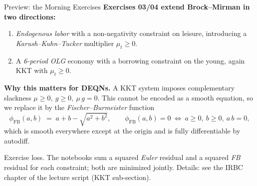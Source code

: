 \documentclass[aspectratio=169,11pt]{beamer}
\newcommand{\emphc}[1]{\textcolor{harvardcrimson}{#1}}
\begin{document}
\begin{frame}{Preview: the Morning Exercises}
\footnotesize
\textbf{Exercises 03/04 extend Brock--Mirman in two directions:}
\begin{enumerate}\itemsep2pt
    \item \emph{Endogenous labor} with a non-negativity constraint on leisure, introducing a \emph{Karush--Kuhn--Tucker} multiplier $\mu_t \ge 0$.
    \item A \emph{6-period OLG} economy with a borrowing constraint on the young, again KKT with $\mu_t \ge 0$.
\end{enumerate}

\vspace{0.4em}
\textbf{Why this matters for DEQNs.}  A KKT system imposes complementary slackness $\mu \ge 0,\ g \ge 0,\ \mu\,g = 0$.  This cannot be encoded as a smooth equation, so we replace it by the \emph{Fischer--Burmeister} function
\[
\phi_{\mathrm{FB}}(a,b) \;=\; a + b - \sqrt{a^2 + b^2}, \qquad \phi_{\mathrm{FB}}(a,b) = 0 \ \Longleftrightarrow\ a \ge 0,\ b \ge 0,\ a\,b = 0,
\]
which is smooth everywhere except at the origin and is fully differentiable by autodiff.

\vspace{0.3em}
{\footnotesize \emphc{Exercise loss.}  The notebooks sum a squared \emph{Euler} residual and a squared \emph{FB} residual for each constraint; both are minimized jointly.  Details: see the IRBC chapter of the lecture script (KKT sub-section).}
\end{frame}
\end{document}
